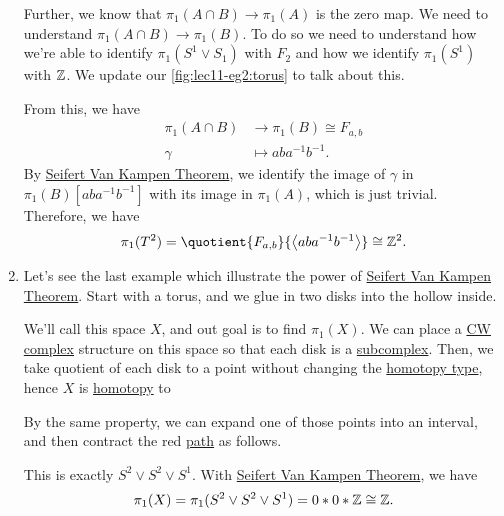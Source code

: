 \begin{eg}
\begin{enumerate}
		      Further, we know that \(\pi _1(A\cap B)\to \pi _1(A)\) is the zero map. We need to understand \(\pi_1(A\cap B)\to \pi _1(B)\). To do so we
		      need to understand how we're able to identify \(\pi _1(S^1\vee S_1)\) with \(F_2\) and how we identify \(\pi _1(S^1)\) with \(\mathbb{\MakeUppercase{z}} \).
		      We update our \autoref{fig:lec11-eg2:torus} to talk about this.
		      \begin{figure}[H]
			      \centering
			      \label{fig:lec11-eg2:torus-ver2}
		      \end{figure}
		      From this, we have
		      \[
			      \begin{split}
				      \pi _1(A\cap B) &\to \pi _1(B)\cong F_{a, b}\\
				      \gamma &\mapsto aba^{-1} b^{-1}.
			      \end{split}
		      \]
		      By \hyperref[thm:Seifert-Van-Kampen-Theorem]{Seifert Van Kampen Theorem}, we identify the image of \(\gamma \) in \(\pi _1(B)[aba^{-1} b^{-1} ]\) with
		      its image in \(\pi _1(A)\), which is just trivial. Therefore, we have
		      \[
			      \pi _1(T^2) = \quotient{F_{a, b}}{\left< aba^{-1} b^{-1}  \right> } \cong \mathbb{\MakeUppercase{z}} ^2.
		      \]
		\item Let's see the last example which illustrate the power of \hyperref[thm:Seifert-Van-Kampen-Theorem]{Seifert Van Kampen Theorem}. Start with a torus, and
		      we glue in two disks into the hollow inside.
		      \begin{figure}[H]
			      \centering
			      \label{fig:lec11:eg-3:1}
		      \end{figure}
		      We'll call this space \(X\), and out goal is to find \(\pi_1(X)\). We can place a \hyperref[def:CW-Complex]{CW complex} structure on this
		      space so that each disk is a \hyperref[def:CW-subcomplex]{subcomplex}. Then, we take quotient of each disk to a point without changing the \hyperref[def:homotopy-type]{homotopy type},
		      hence \(X\) is \hyperref[def:homotopy]{homotopy} to
		      \begin{figure}[H]
			      \centering
			      \label{fig:lec11:eg-3:2}
		      \end{figure}
		      By the same property, we can expand one of those points into an interval, and then contract the red \hyperref[def:path]{path} as follows.
		      \begin{figure}[H]
			      \centering
			      \label{fig:lec11:eg-3:3}
		      \end{figure}
		      This is exactly \(S^{2} \vee S^{2} \vee S^1\). With \hyperref[thm:Seifert-Van-Kampen-Theorem]{Seifert Van Kampen Theorem}, we have
		      \[
			      \pi _1(X) = \pi _1(S^{2} \vee S^{2} \vee S^1) = 0\ast 0\ast \mathbb{\MakeUppercase{z}} \cong \mathbb{\MakeUppercase{z}}.
		      \]
	\end{enumerate}
\end{eg}

